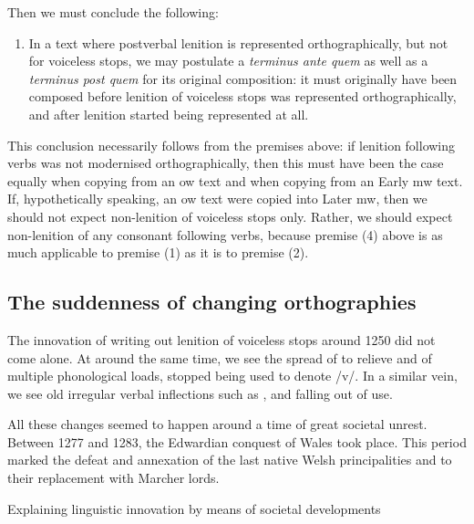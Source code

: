 Then we must conclude the following:
\begin{enumerate}
\item In a text where postverbal lenition is represented orthographically, but not for voiceless stops, we may postulate a \textit{terminus ante quem} as well as a \textit{terminus post quem} for its original composition: it must originally have been composed before lenition of voiceless stops was represented orthographically, and after lenition started being represented at all.
\end{enumerate}

This conclusion necessarily follows from the premises above: if lenition following verbs was not modernised orthographically, then this must have been the case equally when copying from an \gls{ow} text and when copying from an Early \gls{mw} text. If, hypothetically speaking, an \gls{ow} text were copied into Later \gls{mw}, then we should not expect non-lenition of voiceless stops only. Rather, we should expect non-lenition of any consonant following verbs, because premise (4) above is as much applicable to premise (1) as it is to premise (2).


\subsection{The suddenness of changing orthographies}
The innovation of writing out lenition of voiceless stops around 1250 did not come alone. At around the same time, we see the spread of  to relieve  and  of multiple phonological loads,  stopped being used to denote /v/. In a similar vein, we see old irregular verbal inflections such as ,  and  falling out of use.

All these changes seemed to happen around a time of great societal unrest. Between 1277 and 1283, the Edwardian conquest of Wales took place. This period marked the defeat and annexation of the last native Welsh principalities and to their replacement with Marcher lords.

Explaining linguistic innovation by means of societal developments 

